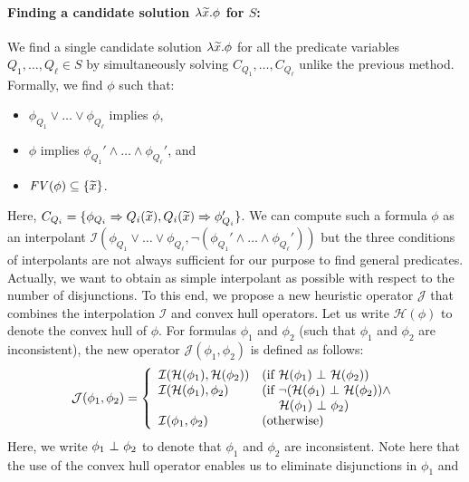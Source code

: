 \paragraph{Finding a candidate solution \(\lambda \widetilde{x}.\phi\) for \(S\):}
We find a single candidate solution \(\lambda \widetilde{x}.\phi\) for all the
predicate variables \(Q_1,\dots,Q_{\ell} \in S\) by simultaneously
solving \(C_{Q_1},\dots,C_{Q_{\ell}}\) unlike the previous method.
Formally, we find \(\phi\) such that:
\begin{itemize}
\item \(\phi_{Q_1} \lor \dots \lor \phi_{Q_{\ell}}\) implies \(\phi\),
\item \(\phi\) implies \(\phi_{Q_1}' \land \dots \land \phi_{Q_{\ell}}'\), and
\item \(\mathit{FV}({\phi}) \subseteq \{{\widetilde{x}}\}\).
\end{itemize}
Here, \(C_{Q_i}=\{{\phi_{Q_i} \Rightarrow Q_i(\widetilde{x}),Q_i(\widetilde{x}) \Rightarrow
\phi_{Q_i}'}\}\).  We can compute such a formula \(\phi\) as an
interpolant \(\mathcal{I}(\phi_{Q_1} \lor \dots \lor
\phi_{Q_{\ell}},\neg (\phi_{Q_1}' \land \dots \land \phi_{Q_{\ell}}'))\)
but the three conditions of interpolants are not always sufficient for
our purpose to find general predicates.  Actually, we want to obtain as
simple interpolant as possible with respect to the number of
disjunctions.
To this end, we propose a new heuristic operator \(\mathcal{J}\) that
combines the interpolation \(\mathcal{I}\) and convex hull operators.
Let us write \(\mathcal{H}(\phi)\) to denote the convex hull of \(\phi\).
 For formulas \(\phi_1\) and \(\phi_2\) (such that \(\phi_1\) and
\(\phi_2\) are inconsistent), the new operator
\(\mathcal{J}(\phi_1,\phi_2)\) is defined as follows:
\[
\mathcal{J}(\phi_1,\phi_2) =
\left\{
\begin{array}{ll}
\mathcal{I}(\mathcal{H}(\phi_1),\mathcal{H}(\phi_2)) & (\mbox{if~}\mathcal{H}(\phi_1) \ \bot\  \mathcal{H}(\phi_2)) \\
\mathcal{I}(\mathcal{H}(\phi_1),\phi_2) & (\mbox{if~}\neg (\mathcal{H}(\phi_1) \ \bot\  \mathcal{H}(\phi_2)) \land \\
&\ \quad \mathcal{H}(\phi_1) \ \bot\  \phi_2) \\
\mathcal{I}(\phi_1,\phi_2) & (\mbox{otherwise})
\end{array}
\right.
\]
Here, we write \(\phi_1 \ \bot\  \phi_2\) to denote that \(\phi_1\) and
\(\phi_2\) are inconsistent.  Note here that the use of the convex hull
operator enables us to eliminate disjunctions in \(\phi_1\) and
